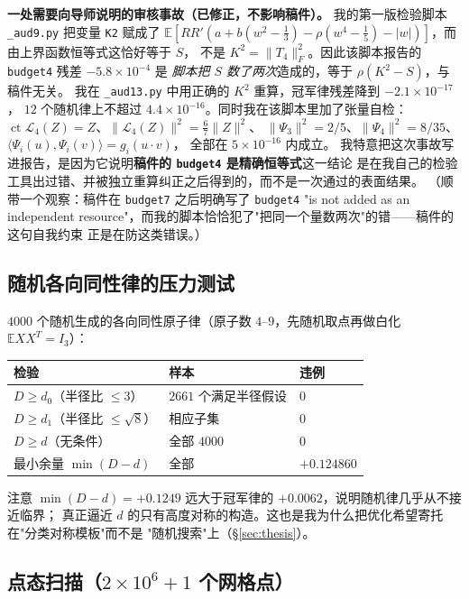 \documentclass[UTF8,11pt]{ctexart}
\theoremstyle{definition}
\newcommand{\E}{\mathbb{E}}
\begin{document}
\textbf{一处需要向导师说明的审核事故（已修正，不影响稿件）。} 我的第一版检验脚本
\texttt{\_aud9.py} 把变量 \texttt{K2} 赋成了
$\E[RR'(a+b(w^2-\frac13)-\rho(w^4-\frac15)-|w|)]$，而由上界函数恒等式这恰好等于 $S$，
不是 $K^2=\|T_4\|_F^2$。因此该脚本报告的 \texttt{budget4} 残差 $-5.8\times10^{-4}$ 是
\emph{脚本把 $S$ 数了两次}造成的，等于 $\rho(K^2-S)$，与稿件无关。
我在 \texttt{\_aud13.py} 中用正确的 $K^2$ 重算，冠军律残差降到 $-2.1\times10^{-17}$，
$12$ 个随机律上不超过 $4.4\times10^{-16}$。同时我在该脚本里加了张量自检：
$\operatorname{ct}\mathcal L_4(Z)=Z$、$\|\mathcal L_4(Z)\|^2=\frac67\|Z\|^2$、
$\|\Psi_3\|^2=2/5$、$\|\Psi_4\|^2=8/35$、$\langle\Psi_i(u),\Psi_i(v)\rangle=g_i(u\cdot v)$，
全部在 $5\times10^{-16}$ 内成立。
我特意把这次事故写进报告，是因为它说明\textbf{稿件的 \texttt{budget4} 是精确恒等式}这一结论
是在我自己的检验工具出过错、并被独立重算纠正之后得到的，而不是一次通过的表面结果。
（顺带一个观察：稿件在 \texttt{budget7} 之后明确写了 \texttt{budget4} "is not added as an
independent resource"，而我的脚本恰恰犯了"把同一个量数两次"的错——稿件的这句自我约束
正是在防这类错误。）

\subsection{随机各向同性律的压力测试}

$4000$ 个随机生成的各向同性原子律（原子数 $4$--$9$，先随机取点再做白化 $\E XX^T=I_3$）：
\begin{center}
\small
\begin{tabular}{lll}
\toprule
检验 & 样本 & 违例\\
\midrule
$D\ge d_0$（半径比 $\le3$） & $2661$ 个满足半径假设 & $0$\\
$D\ge d_1$（半径比 $\le\sqrt8$） & 相应子集 & $0$\\
$D\ge d$（无条件） & 全部 $4000$ & $0$\\
最小余量 $\min(D-d)$ & 全部 & $+0.124860$\\
\bottomrule
\end{tabular}
\end{center}
\noindent 注意 $\min(D-d)=+0.1249$ 远大于冠军律的 $+0.0062$，说明随机律几乎从不接近临界；
真正逼近 $d$ 的只有高度对称的构造。这也是我为什么把优化希望寄托在"分类对称模板"而不是
"随机搜索"上（\S\ref{sec:thesis}）。

\subsection{点态扫描（$2\times10^6+1$ 个网格点）}
\end{document}
